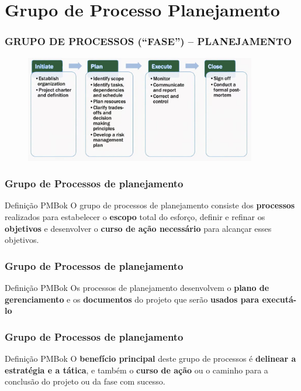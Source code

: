 \section{Grupo de Processo Planejamento}

\begin{frame}
 \frametitle{GRUPO DE PROCESSOS (“FASE”) – PLANEJAMENTO}
  \begin{figure}
   \centering
   \includegraphics[width = 0.9\textwidth]{figs/fig0.png}
  \end{figure}
\end{frame}

\begin{frame}
 \frametitle{Grupo de Processos de planejamento}
 \begin{block}{Definição PMBok}
  O grupo de processos de planejamento consiste dos \textbf{processos} realizados para estabelecer o \textbf{escopo}
total do esforço, definir e refinar os \textbf{objetivos} e desenvolver o  \textbf{curso de ação necessário} para alcançar esses
objetivos.
 \end{block}
\end{frame}

\begin{frame}
 \frametitle{Grupo de Processos de planejamento}
 \begin{block}{Definição PMBok}
 Os processos de planejamento desenvolvem o \textbf{plano de gerenciamento} e os \textbf{documentos} do projeto
que serão \textbf{usados para executá-lo}
 \end{block}
\end{frame}

\begin{frame}
 \frametitle{Grupo de Processos de planejamento}
 \begin{block}{Definição PMBok}
O \textbf{benefício principal} deste grupo de
processos é \textbf{delinear a estratégia e a tática}, e também o \textbf{curso de ação} ou o caminho para a conclusão do
projeto ou da fase com sucesso.
\end{block}
\end{frame}

